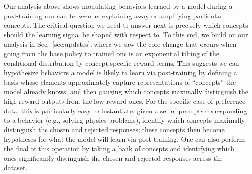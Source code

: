 \documentclass{article} %
\begin{document}
Our analysis above shows modulating behaviors learned by a model during a post-training run can be seen as explaining away or amplifying particular concepts. 
% 
The critical question we need to answer next is precisely which concepts should the learning signal be shaped with respect to.
% 
To this end, we build on our analysis in Sec.~\ref{sec:updates}, where we saw the core change that occurs when going from the base policy to trained one is an exponential tilting of the conditional distribution by concept-specific reward terms.
%
This suggests we can hypothesize behaviors a model is likely to learn via post-training by defining a basis whose elements approximately capture representations of ``concepts'' the model already knows, and then gauging which concepts maximally distinguish the high-reward outputs from the low-reward ones.
% 
For the specific case of preference data, this is particularly easy to instantiate: given a set of prompts corresponding to a behavior (e.g., solving physics problems), identify which concepts maximally distinguish the chosen and rejected responses; these concepts then become hypotheses for what the model will learn via post-training. 
% 
One can also perform the dual of this operation by taking a bank of concepts and identifying which ones significantly distinguish the chosen and rejected responses across the dataset. 
\end{document}
